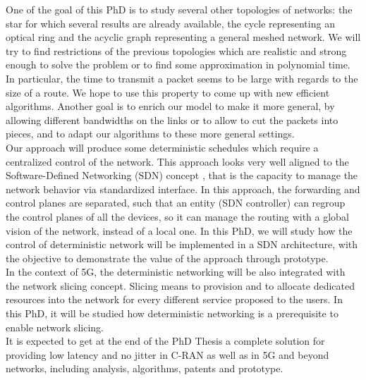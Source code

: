 \documentclass{article}
\begin{document}
One of the goal of this PhD is to study several other topologies of networks: the star for which several results are already available, the cycle representing an optical ring and the acyclic graph representing a general meshed network. We will try to find restrictions of the previous topologies which are realistic and strong enough to solve the problem or to find some approximation in polynomial time. In particular, the time to transmit a packet seems to be large with regards to the size of a route. We hope to use this property to come up with new efficient algorithms.
Another goal is to enrich our model to make it more general, by allowing different bandwidths on the links or to allow to cut the packets into pieces, and to adapt our algorithms to these more general settings.\\

Our approach will produce some deterministic schedules which require a centralized control of the network. This approach looks very well aligned to the Software-Defined Networking (SDN) concept \cite{haleplidis2015software}, that is the capacity to manage the network behavior via standardized interface. In this approach, the forwarding and control planes are separated, such that an entity (SDN controller) can regroup the control planes of all the devices, so it can manage the routing with a global vision of the network, instead of a local one. In this PhD, we will study how the control of deterministic network will be implemented in a SDN architecture, with the objective to demonstrate the value of the approach through prototype.\\

In the context of 5G, the deterministic networking will be also integrated with the network slicing concept. Slicing means to provision and to allocate dedicated resources into the network for every different service proposed to the users.  In this PhD, it will be studied how deterministic networking is a prerequisite to enable network slicing.\\

It is expected to get at the end of the PhD Thesis a complete solution for providing low latency and no jitter  in C-RAN as well as in 5G and beyond networks, including analysis, algorithms, patents and prototype.\\
\end{document}

